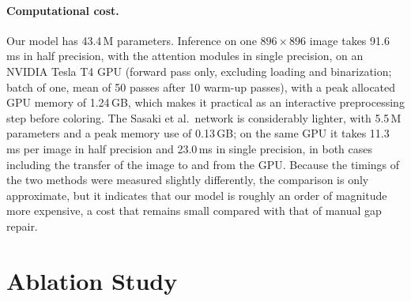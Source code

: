 \documentclass[11pt]{article}
\begin{document}
\paragraph{Computational cost.} Our model has 43.4\,M parameters. Inference on one
$896\times 896$ image takes 91.6\,ms in half precision, with the attention modules in
single precision, on an NVIDIA Tesla T4 GPU (forward pass only, excluding loading and
binarization; batch of one, mean of 50 passes after 10 warm-up passes), with a peak
allocated GPU memory of 1.24\,GB, which makes it practical as an interactive preprocessing step before
coloring. The Sasaki et al.\ network is considerably lighter, with 5.5\,M parameters
and a peak memory use of 0.13\,GB; on the same GPU it takes 11.3\,ms per image in
half precision and 23.0\,ms in single precision, in both cases including the transfer
of the image to and from the GPU. Because the timings of the two methods were measured
slightly differently, the comparison is only approximate, but it indicates that our
model is roughly an order of magnitude more expensive, a cost that remains small
compared with that of manual gap repair.

\section{Ablation Study}
\label{sec:ablation}
\end{document}

